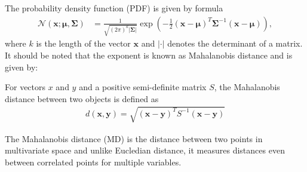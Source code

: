 The probability density function (PDF) is given by formula
\begin{align}
    \mathcal{N}(\mathbf{x};\mathbf{\mu},\mathbf{\Sigma}) &= \frac{1}{\sqrt{(2\pi)^k |\mathbf{\Sigma}|}}\exp(-\frac{1}{2}(\mathbf{x}-\mathbf{\mu})^T\mathbf{\Sigma}^{-1}(\mathbf{x}-\mathbf{\mu})),
\end{align}
where $k$ is the length of the vector $\mathbf{x}$ and $|\cdot|$ denotes the determinant of a matrix. It should be noted that the exponent is known as Mahalanobis distance and is given by:
\begin{definition}
    For vectors $x$ and $y$ and a positive semi-definite matrix $S$, the Mahalanobis distance between two objects is defined as
    \begin{align}
        d(\mathbf{x},\mathbf{y}) = \sqrt{(\mathbf{x}-\mathbf{y})^T S^{-1} (\mathbf{x}-\mathbf{y})}
    \end{align}
\end{definition}
The Mahalanobis distance (MD) is the distance between two points in multivariate space and unlike Eucledian distance, it measures distances even between correlated points for multiple variables.

